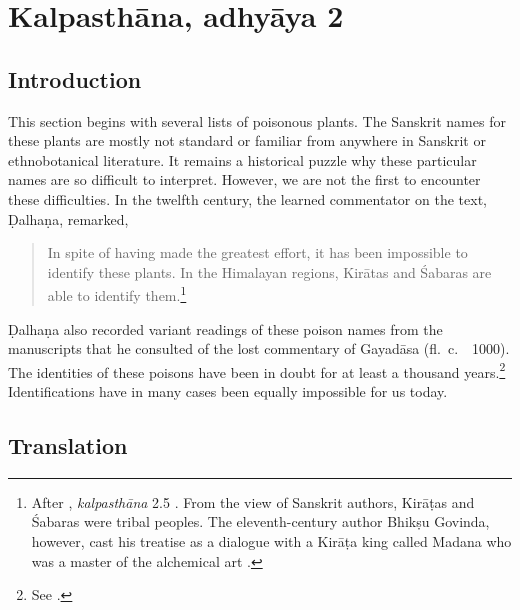 \newcommand{\plant}[4]{#1 (\emph{#2})\footnoteA{#3; see #4}}
\let\chemical = \plant
\newcommand{\skt}[2]{#1 (\emph{#2})}
\newcommand{\sskt}[2]{\empty}
%
\newcommand{\diff}[1]{\textcolor{red}{#1}}

\section{Kalpasthāna, adhyāya 2}

\subsection{Introduction}

This section begins with several lists of poisonous plants.  The Sanskrit names
for these plants are mostly not standard or familiar from anywhere in Sanskrit or
ethnobotanical literature.  It remains a historical puzzle why these particular
names are so difficult to interpret.  
However, we 
are not the first to encounter
these difficulties. In the twelfth century, the learned commentator on the text,
Ḍalhaṇa, remarked,
\begin{quote}
In spite of having made the greatest effort, it has been impossible to identify
these plants. In the Himalayan regions, Kirātas and Śabaras are able to identify
them.\footnote{After \SS, \emph{kalpasthāna} 2.5 \citep[564]{vulgate}. From the
view of Sanskrit authors, Kirāṭas and Śabaras were tribal peoples.  The
eleventh-century author Bhikṣu Govinda, however, cast his treatise as a dialogue 
with a
Kirāṭa king called Madana who was a master of the alchemical art \citep[IIA,
620]{meul-hist}.}
\end{quote}
Ḍalhaṇa also recorded variant readings of these poison names from the 
manuscripts
that he consulted of the lost commentary of Gayadāsa (fl.\ c.\ \AD\ 1000).
The identities of these poisons have been in doubt for at least a
thousand years.\footnote{See \cite[80--81]{wuja-2003}.}  Identifications have in
many cases been equally impossible for us today.


\subsection{Translation}

